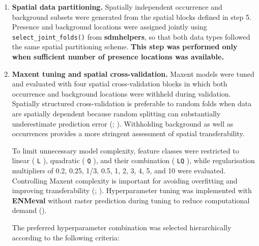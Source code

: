 \documentclass[
  openany]{book}
\let\OldTexttt\texttt
\renewcommand{\texttt}[1]{%
  \OldTexttt{\small #1}%
}
\begin{document}
\begin{enumerate}
\item
  \textbf{Spatial data partitioning.} Spatially independent occurrence and background subsets were generated from the spatial blocks defined in step 5. Presence and background locations were assigned jointly using \texttt{select\_joint\_folds()} from \textbf{sdmhelpers}, so that both data types followed the same spatial partitioning scheme. \textbf{This step was performed only when sufficient number of presence locations was available.}
\item
  \textbf{Maxent tuning and spatial cross-validation.} Maxent models were tuned and evaluated with four spatial cross-validation blocks in which both occurrence and background locations were withheld during validation. Spatially structured cross-validation is preferable to random folds when data are spatially dependent because random splitting can substantially underestimate prediction error (; ). Withholding background as well as occurrences provides a more stringent assessment of spatial transferability.

  To limit unnecessary model complexity, feature classes were restricted to linear (\texttt{L}), quadratic (\texttt{Q}), and their combination (\texttt{LQ}), while regularisation multipliers of 0.2, 0.25, 1/3, 0.5, 1, 2, 3, 4, 5, and 10 were evaluated. Controlling Maxent complexity is important for avoiding overfitting and improving transferability (; ). Hyperparameter tuning was implemented with \textbf{ENMeval} without raster prediction during tuning to reduce computational demand ().

  The preferred hyperparameter combination was selected hierarchically according to the following criteria:


\end{enumerate}
\end{document}
